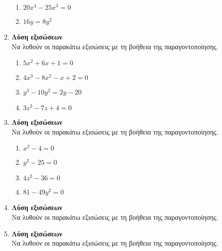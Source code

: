 \documentclass[twoside,nofonts,internet]{askhseis}
\begin{document}
\begin{enumerate}
\begin{multicols}{2}
\begin{enumerate}[itemsep=0mm,label=\roman*.]
\item $ 20x^4-25x^3=0 $
\item $ 16y=8y^2 $
\end{enumerate}
\end{multicols}
\item \textbf{Λύση εξισώσεων}\\
Να λυθούν οι παρακάτω εξισώσεις με τη βοήθεια της παραγοντοποίησης.
\begin{enumerate}[itemsep=0mm,label=\roman*.]
\item $ 5x^2+6x+1=0 $
\item $ 4x^3-8x^2-x+2=0 $
\item $ y^3-10y^2=2y-20 $
\item $ 3z^2-7z+4=0 $
\end{enumerate}
\item \textbf{Λύση εξισώσεων}\\
Να λυθούν οι παρακάτω εξισώσεις με τη βοήθεια της παραγοντοποίησης.
\begin{multicols}{2}
\begin{enumerate}[itemsep=0mm,label=\roman*.]
\item $ x^2-4=0 $
\item $ y^2-25=0 $
\item $ 4z^2-36=0 $
\item $ 81-49y^2=0 $
\end{enumerate}
\end{multicols}
\item \textbf{Λύση εξισώσεων}\\
Να λυθούν οι παρακάτω εξισώσεις με τη βοήθεια της παραγοντοποίησης.
\item \textbf{Λύση εξισώσεων}\\
Να λυθούν οι παρακάτω εξισώσεις με τη βοήθεια της παραγοντοποίησης.
\end{enumerate}
\end{document}
